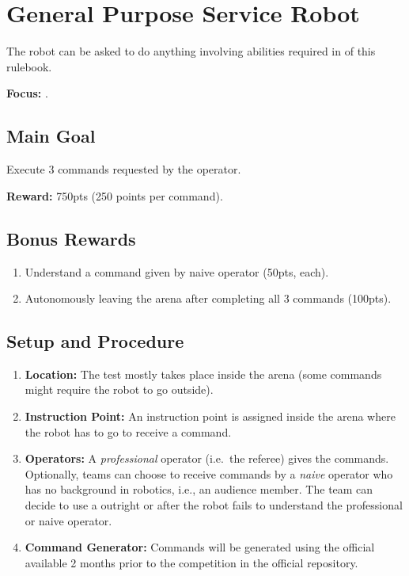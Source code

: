 \section{General Purpose Service Robot}
\label{test:gpsr}
The robot can be asked to do anything involving abilities required in \SONE{} of this rulebook.

\noindent \textbf{Focus:} \SysI.

\subsection*{Main Goal}
Execute 3 commands requested by the operator.

\noindent\textbf{Reward:} 750pts (250 points per command).

\subsection*{Bonus Rewards}
\begin{enumerate}[nosep]
	\item Understand a command given by naive operator (50pts, each).
	\item Autonomously leaving the arena after completing all 3 commands (100pts).
\end{enumerate}

%
%
\subsection*{Setup and Procedure}
\begin{enumerate}[nosep]
	\item \textbf{Location:} The test mostly takes place inside the arena (some commands might require the robot to go outside).
	
	\item \textbf{Instruction Point:} An instruction point is assigned inside the arena where the robot has to go to receive a command.
	
	\item \textbf{Operators:} A \emph{professional} operator (i.e.~the referee) gives the commands. Optionally, teams can choose to receive commands by a \emph{naive} operator who has no background in robotics, i.e., an audience member. The team can decide to use a \CustomOperator{} outright or after the robot fails to understand the professional or naive operator.
	
	\item \textbf{Command Generator:} Commands will be generated using the official \CommandGen{} available 2 months prior to the competition in the official repository\footnotemark {}.
\end{enumerate}


